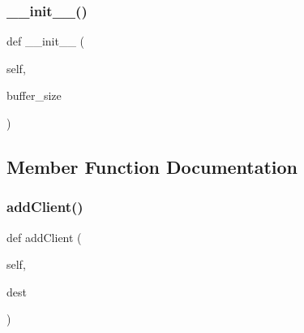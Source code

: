 \subsubsection{\texorpdfstring{\+\_\+\+\_\+init\+\_\+\+\_\+()}{\_\_init\_\_()}}
{\footnotesize\ttfamily def \+\_\+\+\_\+init\+\_\+\+\_\+ (\begin{DoxyParamCaption}\item[{}]{self,  }\item[{}]{buffer\+\_\+size }\end{DoxyParamCaption})}



\subsection{Member Function Documentation}
\mbox{\label{class_client_1_1_client_reseiver_a011b151c914b97254dbfb0c745ce6c84}} 
\subsubsection{\texorpdfstring{add\+Client()}{addClient()}}
{\footnotesize\ttfamily def add\+Client (\begin{DoxyParamCaption}\item[{}]{self,  }\item[{}]{dest }\end{DoxyParamCaption})}

